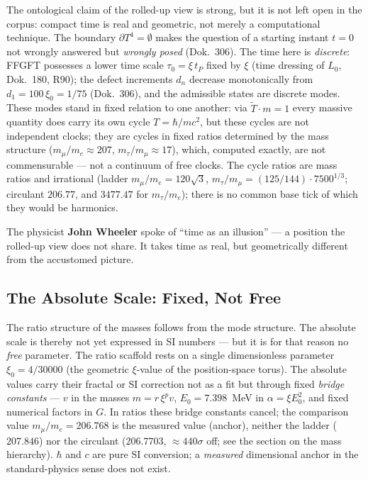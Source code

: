 The ontological claim of the rolled-up view is strong, but it is not left open in the corpus: compact time is real and geometric, not merely a computational technique. The boundary $\partial T^4 = \emptyset$ makes the question of a starting instant $t=0$ not wrongly answered but \emph{wrongly posed} (Dok.~306). The time here is \emph{discrete}: FFGFT possesses a lower time scale $\tau_0 = \xi\,t_P$ fixed by $\xi$ (time dressing of $L_0$, Dok.~180, R90); the defect increments $d_n$ decrease monotonically from $d_1 = 100\,\xi_0 = 1/75$ (Dok.~306), and the admissible states are discrete modes. These modes stand in fixed relation to one another: via $\tilde T\cdot m = 1$ every massive quantity does carry its own cycle $T=\hbar/mc^2$, but these cycles are not independent clocks; they are cycles in fixed ratios determined by the mass structure ($m_\mu/m_e \approx 207$, $m_\tau/m_\mu \approx 17$), which, computed exactly, are not commensurable --- not a continuum of free clocks. The cycle ratios are mass ratios and irrational (ladder $m_\mu/m_e=120\sqrt3$, $m_\tau/m_\mu=(125/144)\cdot7500^{1/3}$; circulant $206.77$, and $3477.47$ for $m_\tau/m_e$); there is no common base tick of which they would be harmonics.

The physicist \textbf{John Wheeler} spoke of ``time as an illusion'' --- a position the rolled-up view does not share. It takes time as real, but geometrically different from the accustomed picture.

\subsection{The Absolute Scale: Fixed, Not Free}

The ratio structure of the masses follows from the mode structure. The absolute scale is thereby not yet expressed in SI numbers --- but it is for that reason no \emph{free} parameter. The ratio scaffold rests on a single dimensionless parameter $\xi_0 = 4/30000$ (the geometric $\xi$-value of the position-space torus). The absolute values carry their fractal or SI correction not as a fit but through fixed \emph{bridge constants} --- $v$ in the masses $m = r\,\xi^{p} v$, $E_0 = 7.398$~MeV in $\alpha = \xi E_0^2$, and fixed numerical factors in $G$. In ratios these bridge constants cancel; the comparison value $m_\mu/m_e = 206.768$ is the measured value (anchor), neither the ladder ($207.846$) nor the circulant ($206.7703$, ${\approx}440\sigma$ off; see the section on the mass hierarchy). $\hbar$ and $c$ are pure SI conversion; a \emph{measured} dimensional anchor in the standard-physics sense does not exist.

